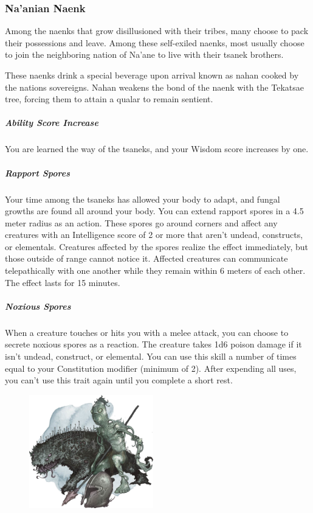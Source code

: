 \subsubsection{Na'anian Naenk}
    Among the naenks that grow disillusioned with their tribes, many choose to pack their possessions and leave.
    Among these self-exiled naenks, most usually choose to join the neighboring nation of Na'ane to live with their tsanek brothers.

    These naenks drink a special beverage upon arrival known as nahan cooked by the nations sovereigns.
    Nahan weakens the bond of the naenk with the Tekatsae tree, forcing them to attain a qualar to remain sentient.

    \subparagraph{Ability Score Increase} You are learned the way of the tsaneks, and your Wisdom score increases by one.

    \subparagraph{Rapport Spores} Your time among the tsaneks has allowed your body to adapt, and fungal growths are found all around your body.
    You can extend rapport spores in a 4.5 meter radius as an action.
    These spores go around corners and affect any creatures with an Intelligence score of 2 or more that aren't undead, constructs, or elementals.
    Creatures affected by the spores realize the effect immediately, but those outside of range cannot notice it.
    Affected creatures can communicate telepathically with one another while they remain within 6 meters of each other.
    The effect lasts for 15 minutes.

    \subparagraph{Noxious Spores} When a creature touches or hits you with a melee attack, you can choose to secrete noxious spores as a reaction.
    The creature takes 1d6 poison damage if it isn't undead, construct, or elemental.
    You can use this skill a number of times equal to your Constitution modifier (minimum of 2).
    After expending all uses, you can't use this trait again until you complete a short rest.

\begin{figure}[!b]
    \centering
    \includegraphics[width=0.48\textwidth]{04kins/img/15naenk_nuen.png}
\end{figure}

\newpage
